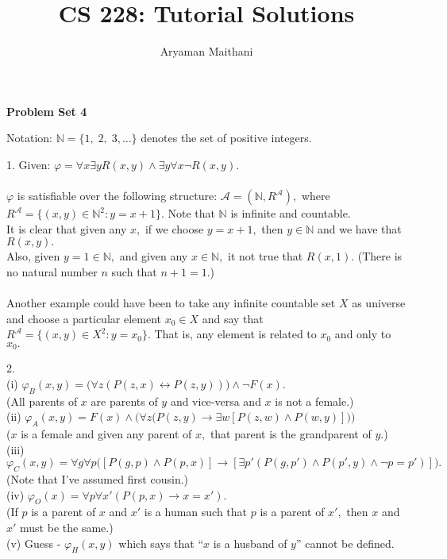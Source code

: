 \documentclass{article}
\title{CS 228: Tutorial Solutions}
\author{Aryaman Maithani}
\date{}
\begin{document}
\maketitle
\begin{center}
\textbf{Problem Set 4}
\end{center}
Notation: $\mathbb{N} = \{1,\;2,\;3,\ldots\}$ denotes the set of positive integers.

\hrulefill

1. Given: $\varphi = \forall x \exists y R(x, y) \wedge \exists y \forall x \neg R(x, y).$ \\~\\
$\varphi$ is satisfiable over the following structure: $\mathcal{A} = (\mathbb{N}, R^\mathcal{A}),$ where $R^\mathcal{A} = \{(x, y) \in \mathbb{N}^2 : y = x + 1\}.$ Note that $\mathbb{N}$ is infinite and countable.\\
It is clear that given any $x,$ if we choose $y = x+1,$ then $y \in \mathbb{N}$ and we have that $R(x, y).$\\
Also, given $y = 1 \in \mathbb{N},$ and given any $x \in \mathbb{N},$ it not true that $R(x, 1).$ (There is no natural number $n$ such that $n + 1 = 1.$)\\~\\
Another example could have been to take any infinite countable set $X$ as universe and choose a particular element $x_0 \in X$ and say that $R^\mathcal{A} = \{(x, y) \in X^2 : y = x_0\}.$ That is, any element is related to $x_0$ and only to $x_0.$

\hrulefill

2.\\
(i) $\varphi_B(x, y) = \big(\forall z(P(z, x) \leftrightarrow P(z, y))\big) \wedge \neg F(x).$\\
(All parents of $x$ are parents of $y$ and vice-versa and $x$ is not a female.)\\
(ii) $\varphi_A(x, y) = F(x) \wedge \bigg(\forall z\big(P(z, y) \to \exists w [P(z, w) \wedge P(w, y)]\big)\bigg)$\\
($x$ is a female and given any parent of $x,$ that parent is the grandparent of $y.$)\\
(iii) $\varphi_C(x, y) = \forall g \forall p\big([P(g, p) \wedge P(p, x)] \to [\exists p' (P(g, p') \wedge P(p', y) \wedge \neg p = p')]\big).$\\
(Note that I've assumed first cousin.)\\
(iv) $\varphi_O(x) = \forall p \forall x'(P(p, x) \to x = x').$\\
(If $p$ is a parent of $x$ and $x'$ is a human such that $p$ is a parent of $x',$ then $x$ and $x'$ must be the same.)\\
(v) Guess - $\varphi_H(x, y)$ which says that ``$x$ is a husband of $y$'' cannot be defined.
\end{document}
